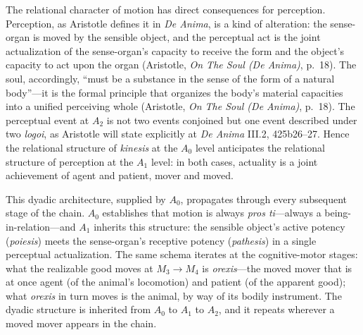The relational character of motion has direct consequences for perception. Perception, as Aristotle defines it in \textit{De Anima}, is a kind of alteration: the sense-organ is moved by the sensible object, and the perceptual act is the joint actualization of the sense-organ's capacity to receive the form and the object's capacity to act upon the organ (Aristotle, \textit{On The Soul (De Anima)}, p.~18). The soul, accordingly, ``must be a substance in the sense of the form of a natural body''---it is the formal principle that organizes the body's material capacities into a unified perceiving whole (Aristotle, \textit{On The Soul (De Anima)}, p.~18). The perceptual event at $A_2$ is not two events conjoined but one event described under two \textit{logoi}, as Aristotle will state explicitly at \textit{De Anima} III.2, 425b26--27. Hence the relational structure of \textit{kinesis} at the $A_0$ level anticipates the relational structure of perception at the $A_1$ level: in both cases, actuality is a joint achievement of agent and patient, mover and moved.

This dyadic architecture, supplied by $A_0$, propagates through every subsequent stage of the chain. $A_0$ establishes that motion is always \textit{pros ti}---always a being-in-relation---and $A_1$ inherits this structure: the sensible object's active potency (\textit{poiesis}) meets the sense-organ's receptive potency (\textit{pathesis}) in a single perceptual actualization. The same schema iterates at the cognitive-motor stages: what the realizable good moves at $M_3 \to M_4$ is \textit{orexis}---the moved mover that is at once agent (of the animal's locomotion) and patient (of the apparent good); what \textit{orexis} in turn moves is the animal, by way of its bodily instrument. The dyadic structure is inherited from $A_0$ to $A_1$ to $A_2$, and it repeats wherever a moved mover appears in the chain.

